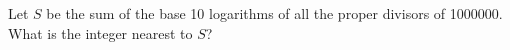 Let $S$ be the sum of the base 10 logarithms of all the proper divisors of 1000000. What is the integer nearest to $S$?